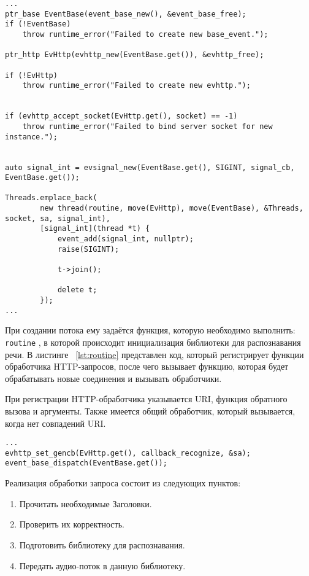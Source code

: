 \begin{lstlisting}[caption={Пример создания нескольких потоков обслуживания}, label={lst:ev:thread}]
...
ptr_base EventBase(event_base_new(), &event_base_free);
if (!EventBase)
    throw runtime_error("Failed to create new base_event.");

ptr_http EvHttp(evhttp_new(EventBase.get()), &evhttp_free);

if (!EvHttp)
    throw runtime_error("Failed to create new evhttp.");


if (evhttp_accept_socket(EvHttp.get(), socket) == -1)
    throw runtime_error("Failed to bind server socket for new instance.");


auto signal_int = evsignal_new(EventBase.get(), SIGINT, signal_cb, EventBase.get());

Threads.emplace_back(
        new thread(routine, move(EvHttp), move(EventBase), &Threads, socket, sa, signal_int),
        [signal_int](thread *t) {
            event_add(signal_int, nullptr);
            raise(SIGINT);

            t->join();

            delete t;
        });
...
\end{lstlisting}

При создании потока ему задаётся функция, которую необходимо выполнить: \texttt{routine}
, в которой происходит инициализация библиотеки для распознавания речи. В листинге~
\ref{lst:routine} представлен код, который регистрирует функции обработчика HTTP-запросов,
после чего вызывает функцию, которая будет обрабатывать новые соединения и вызывать
обработчики.

При регистрации HTTP-обработчика указывается URI, функция обратного вызова и аргументы.
Также имеется общий обработчик, который вызывается, когда нет совпадений URI.

\begin{lstlisting}[caption={Инициализация обработчиков}, label={lst:routine}]
...
evhttp_set_gencb(EvHttp.get(), callback_recognize, &sa);
event_base_dispatch(EventBase.get());
\end{lstlisting}

Реализация обработки запроса состоит из следующих пунктов:
\begin{enumerate}
    \item Прочитать необходимые Заголовки.
    \item Проверить их корректность.
    \item Подготовить библиотеку для распознавания.
    \item Передать аудио-поток в данную библиотеку.
\end{enumerate}

